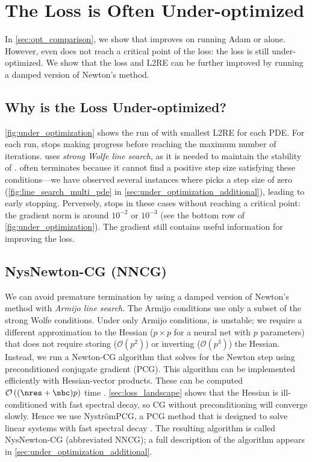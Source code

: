 \section{The Loss is Often Under-optimized}
\label{sec:under_optimized}
In \cref{sec:opt_comparison}, we show that \al{} improves on running Adam or \lbfgs{} alone.
However, even \al{} does not reach a critical point of the loss: the loss is still under-optimized.
We show that the loss and L2RE can be further improved by running a damped version of Newton's method.

\subsection{Why is the Loss Under-optimized?}
\cref{fig:under_optimization} shows the run of \al{} with smallest L2RE for each PDE.
For each run, \lbfgs{} stops making progress before reaching the maximum number of iterations.
\lbfgs{} uses \textit{strong Wolfe line search}, as it is needed to maintain the stability of \lbfgs{} \cite{nocedal2006numerical}.
\lbfgs{} often terminates because it cannot find a positive step size satisfying these conditions---we have observed several instances where \lbfgs{} picks a step size of zero (\cref{fig:line_search_multi_pde} in \cref{sec:under_optimization_additional}), leading to early stopping.
Perversely, \lbfgs{} stops in these cases without reaching a critical point: 
the gradient norm is around $10^{-2}$ or $10^{-3}$ 
(see the bottom row of \cref{fig:under_optimization}).
The gradient still contains useful information for improving the loss.

\subsection{NysNewton-CG (NNCG)}
\label{subsec:NNCG} 
We can avoid premature termination by using a damped version of Newton's method with \textit{Armijo line search}.
The Armijo conditions use only a subset of the strong Wolfe conditions.
Under only Armijo conditions, \lbfgs{} is unstable; we require a different 
approximation to the Hessian ($p\times p$ for a neural net with $p$ parameters) that does not require storing ($\mathcal O(p^2)$) or inverting ($\mathcal O(p^3)$) the Hessian.
Instead, we run a Newton-CG algorithm that solves for the Newton step using preconditioned conjugate gradient (PCG).
This algorithm can be implemented efficiently with Hessian-vector products. These can be computed $\mathcal{O}\left((\nres+\nbc)p\right)$ time \cite{pearlmutter1994fast}.
\cref{sec:loss_landscape} shows that the Hessian is ill-conditioned with fast spectral decay, so CG without preconditioning will converge slowly.
Hence we use Nystr\"{o}mPCG, a PCG method that is designed to solve linear systems with fast spectral decay \cite{frangella2023randomized}.
The resulting algorithm is called NysNewton-CG (abbreviated NNCG); a full description of the algorithm appears in \cref{sec:under_optimization_additional}.

